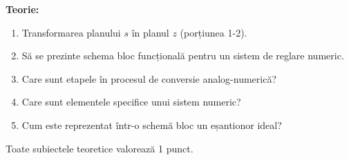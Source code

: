 \documentclass[11pt,a4paper]{article}
\begin{document}
\textbf{Teorie:}
\begin{enumerate}[leftmargin=1.4em]
\item Transformarea planului $s$ în planul $z$ (porțiunea 1-2).
\item Să se prezinte schema bloc funcțională pentru un sistem de reglare numeric.
\item Care sunt etapele în procesul de conversie analog-numerică?
\item Care sunt elementele specifice unui sistem numeric?
\item Cum este reprezentat într-o schemă bloc un eșantionor ideal?
\end{enumerate}

\vspace{0.2cm}
\small Toate subiectele teoretice valorează 1 punct.
\end{document}
